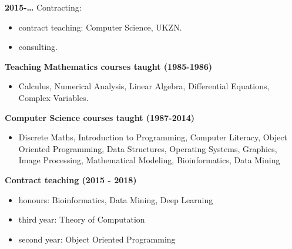 \begin{description}
\begin{description}
{\bf 2015-\ldots}
Contracting:

\begin{itemize}
\item contract teaching: Computer Science, UKZN.
\item consulting.
\end{itemize}


\newpage
\item[] {\large \bf Teaching}\newline
\newline
{\large \bf Mathematics courses taught (1985-1986)}

 \begin{itemize} 
  \item[] Calculus, Numerical Analysis, Linear Algebra, \newline
       Differential Equations, Complex Variables.
 \end{itemize}

{\large \bf  Computer Science courses taught (1987-2014)}
\begin{itemize}
\item[]  Discrete Maths, Introduction to Programming, Computer Literacy, \newline
             Object Oriented Programming, Data Structures, \newline
             Operating Systems, Graphics, \newline
             Image Processing, Mathematical Modeling, \newline
             Bioinformatics, Data Mining
\end{itemize}


{\large \bf Contract teaching (2015 - 2018)}
\begin{itemize}
	\item[] honours: Bioinformatics, Data Mining, Deep Learning
	\item[] third year: Theory of Computation
	\item[] second year: Object Oriented Programming
\end{itemize}


\end{description}
\end{description}
\label{f0}
